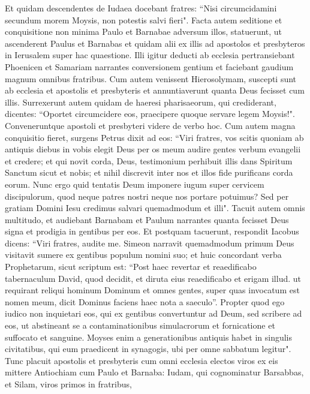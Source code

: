 \begin{biblechapter}  
\verse Et quidam descendentes de Iudaea docebant fratres: “Nisi circumcidamini secundum morem Moysis, non potestis salvi fieri". 
\verse Facta autem seditione et conquisitione non minima Paulo et Barnabae adversum illos, statuerunt, ut ascenderent Paulus et Barnabas et quidam alii ex illis ad apostolos et presbyteros in Ierusalem super hac quaestione. 
\verse Illi igitur deducti ab ecclesia pertransiebant Phoenicen et Samariam narrantes conversionem gentium et faciebant gaudium magnum omnibus fratribus. 
\verse Cum autem venissent Hierosolymam, suscepti sunt ab ecclesia et apostolis et presbyteris et annuntiaverunt quanta Deus fecisset cum illis. 
\verse Surrexerunt autem quidam de haeresi pharisaeorum, qui crediderant, dicentes: “Oportet circumcidere eos, praecipere quoque servare legem Moysis!". 
\verse Conveneruntque apostoli et presbyteri videre de verbo hoc. 
\verse Cum autem magna conquisitio fieret, surgens Petrus dixit ad eos: “Viri fratres, vos scitis quoniam ab antiquis diebus in vobis elegit Deus per os meum audire gentes verbum evangelii et credere; 
\verse et qui novit corda, Deus, testimonium perhibuit illis dans Spiritum Sanctum sicut et nobis; 
\verse et nihil discrevit inter nos et illos fide purificans corda eorum. 
\verse Nunc ergo quid tentatis Deum imponere iugum super cervicem discipulorum, quod neque patres nostri neque nos portare potuimus? 
\verse Sed per gratiam Domini Iesu credimus salvari quemadmodum et illi". 
\verse Tacuit autem omnis multitudo, et audiebant Barnabam et Paulum narrantes quanta fecisset Deus signa et prodigia in gentibus per eos. 
\verse Et postquam tacuerunt, respondit Iacobus dicens: “Viri fratres, audite me. 
\verse Simeon narravit quemadmodum primum Deus visitavit sumere ex gentibus populum nomini suo; 
\verse et huic concordant verba Prophetarum, sicut scriptum est: 
\verse “Post haec revertar et reaedificabo tabernaculum David, quod decidit, et diruta eius reaedificabo et erigam illud. 
\verse ut requirant reliqui hominum Dominum et omnes gentes, super quas invocatum est nomen meum, dicit Dominus faciens haec 
\verse nota a saeculo”. 
\verse Propter quod ego iudico non inquietari eos, qui ex gentibus convertuntur ad Deum, 
\verse sed scribere ad eos, ut abstineant se a contaminationibus simulacrorum et fornicatione et suffocato et sanguine. 
\verse Moyses enim a generationibus antiquis habet in singulis civitatibus, qui eum praedicent in synagogis, ubi per omne sabbatum legitur". 
\verse Tunc placuit apostolis et presbyteris cum omni ecclesia electos viros ex eis mittere Antiochiam cum Paulo et Barnaba: Iudam, qui cognominatur Barsabbas, et Silam, viros primos in fratribus, 

\end{biblechapter}
